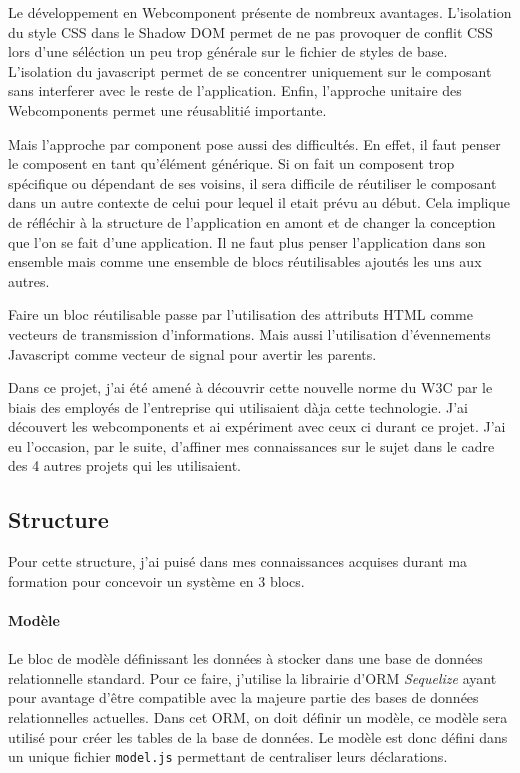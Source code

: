\bigskip

Le développement en Webcomponent présente de nombreux avantages.
L'isolation du style CSS dans le Shadow DOM permet de ne pas provoquer de conflit CSS lors d'une séléction un peu trop générale sur le fichier de styles de base.
L'isolation du javascript permet de se concentrer uniquement sur le composant sans interferer avec le reste de l'application.
Enfin, l'approche unitaire des Webcomponents permet une réusablitié importante.

Mais l'approche par component pose aussi des difficultés.
En effet, il faut penser le composent en tant qu'élément générique.
Si on fait un composent trop spécifique ou dépendant de ses voisins, il sera difficile de réutiliser le composant dans un autre contexte de celui pour lequel il etait prévu au début.
Cela implique de réfléchir à la structure de l'application en amont et de changer la conception que l'on se fait d'une application.
Il ne faut plus penser l'application dans son ensemble mais comme une ensemble de blocs réutilisables ajoutés les uns aux autres.

Faire un bloc réutilisable passe par l'utilisation des attributs HTML comme vecteurs de transmission d'informations.
Mais aussi l'utilisation d'évennements Javascript comme vecteur de signal pour avertir les parents.

\bigskip

Dans ce projet, j'ai été amené à découvrir cette nouvelle norme du W3C par le biais des employés de l'entreprise qui utilisaient dàja cette technologie.
J'ai découvert les webcomponents et ai expériment avec ceux ci durant ce projet.
J'ai eu l'occasion, par le suite, d'affiner mes connaissances sur le sujet dans le cadre des 4 autres projets qui les utilisaient.

\subsection{Structure}

Pour cette structure, j'ai puisé dans mes connaissances acquises durant ma formation pour concevoir un système en 3 blocs.

\paragraph{Modèle} Le bloc de modèle définissant les données à stocker dans une base de données relationnelle standard.
Pour ce faire, j'utilise la librairie d'ORM \emph{Sequelize} ayant pour avantage d'être compatible avec la majeure partie des bases de données relationnelles actuelles.
Dans cet ORM, on doit définir un modèle, ce modèle sera utilisé pour créer les tables de la base de données.
Le modèle est donc défini dans un unique fichier \texttt{model.js} permettant de centraliser leurs déclarations.


